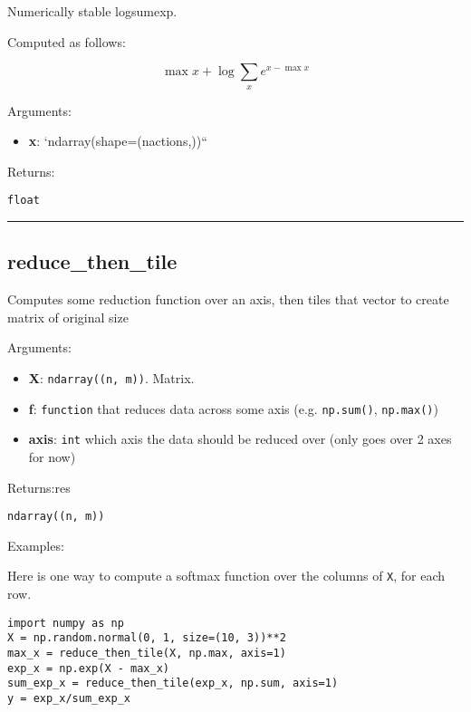 Numerically stable logsumexp.

Computed as follows:

\[
\max x + \log \sum_x e^{x - \max x}
\]

Arguments:

\begin{itemize}
\tightlist
\item
  \textbf{x}: `ndarray(shape=(nactions,))``
\end{itemize}

Returns:

\texttt{float}

\begin{center}\rule{0.5\linewidth}{\linethickness}\end{center}

\subsection{reduce\_then\_tile}\label{reduce_then_tile}

\begin{Shaded}
\begin{Highlighting}[]
\OperatorTok{=}\NormalTok{)}
\end{Highlighting}
\end{Shaded}

Computes some reduction function over an axis, then tiles that vector to
create matrix of original size

Arguments:

\begin{itemize}
\tightlist
\item
  \textbf{X}: \texttt{ndarray((n,\ m))}. Matrix.
\item
  \textbf{f}: \texttt{function} that reduces data across some axis (e.g.
  \texttt{np.sum()}, \texttt{np.max()})
\item
  \textbf{axis}: \texttt{int} which axis the data should be reduced over
  (only goes over 2 axes for now)
\end{itemize}

Returns:res

\texttt{ndarray((n,\ m))}

Examples:

Here is one way to compute a softmax function over the columns of
\texttt{X}, for each row.

\begin{verbatim}
import numpy as np
X = np.random.normal(0, 1, size=(10, 3))**2
max_x = reduce_then_tile(X, np.max, axis=1)
exp_x = np.exp(X - max_x)
sum_exp_x = reduce_then_tile(exp_x, np.sum, axis=1)
y = exp_x/sum_exp_x
\end{verbatim}

